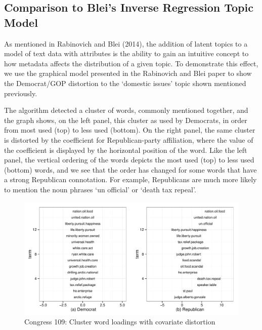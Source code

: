 \documentclass[12pt]{article}
\begin{document}
\subsection{Comparison to Blei's Inverse Regression Topic Model}
As mentioned in Rabinovich and Blei (2014), the addition of latent topics to a model of text data with attributes is the ability to gain an intuitive concept to how metadata affects the distribution of a given topic. 
To demonstrate this effect, we use the graphical model presented in the Rabinovich and Blei paper to show the Democrat/GOP distortion to the `domestic issues'  topic shown mentioned previously. 

The algorithm detected a cluster of words, commonly mentioned together, and the graph shows, on the left panel, this cluster as used by Democrats, in order from most used (top) to less used (bottom). On the right panel, the same cluster is distorted by the coefficient for Republican-party affiliation, where the value of the coefficient is displayed by the horizontal position of the word. Like the left panel, the vertical ordering of the words depicts the most used (top) to less used (bottom) words, and we see that the order has changed for some words that have a strong Republican connotation. For example, Republicans are much more likely to mention the noun phrases `un official' or `death tax repeal'. 

\begin{figure}[!htpb]
  \centering
\caption[Loadings]{Congress 109: Cluster word loadings with covariate distortion}
  \includegraphics[width=6.2in]{Images/Blei_Changing_Loadings_GOP.pdf}
\end{figure}
\end{document}
